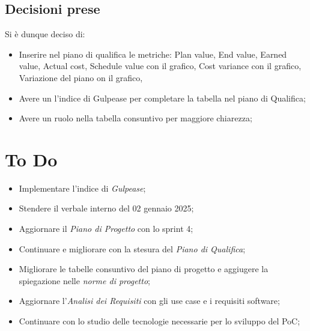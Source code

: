 \documentclass[a4paper, 12pt]{article}
\begin{document}
\subsection{Decisioni prese}
Si è dunque deciso di:
\begin{itemize}
    \item Inserire nel piano di qualifica le metriche:
    Plan value, 
    End value,
    Earned value,
    Actual cost,
    Schedule value con il grafico,
    Cost variance con il grafico,
    Variazione del piano on il grafico,
    \item Avere un l'indice di Gulpease per completare la tabella nel piano di Qualifica;
    \item Avere un ruolo nella tabella consuntivo per maggiore chiarezza;
    
\end{itemize}
\section{To Do}
\begin{itemize}
    \item Implementare l'indice di \textit{Gulpease};
    \item Stendere il verbale interno del 02 gennaio 2025;
    \item Aggiornare il \textit{Piano di Progetto} con lo sprint 4;
    \item Continuare e migliorare con la stesura del \textit{Piano di Qualifica};
    \item Migliorare le tabelle consuntivo del piano di progetto e aggiugere la spiegazione nelle \textit{norme di progetto};
    \item Aggiornare l'\textit{Analisi dei Requisiti} con gli use case e i requisiti software;
    \item Continuare con lo studio delle tecnologie necessarie per lo sviluppo del PoC;
\end{itemize}
\end{document}
